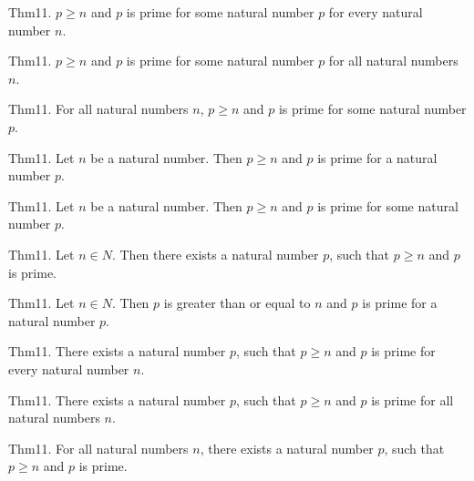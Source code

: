 \documentclass{article}
\begin{document}
Thm11. $p \geq n$ and $p$ is prime for some natural number $p$ for every natural number $n$.

Thm11. $p \geq n$ and $p$ is prime for some natural number $p$ for all natural numbers $n$.

Thm11. For all natural numbers $n$, $p \geq n$ and $p$ is prime for some natural number $p$.

Thm11. Let $n$ be a natural number. Then $p \geq n$ and $p$ is prime for a natural number $p$.

Thm11. Let $n$ be a natural number. Then $p \geq n$ and $p$ is prime for some natural number $p$.

Thm11. Let $n \in N$. Then there exists a natural number $p$, such that $p \geq n$ and $p$ is prime.

Thm11. Let $n \in N$. Then $p$ is greater than or equal to $n$ and $p$ is prime for a natural number $p$.

Thm11. There exists a natural number $p$, such that $p \geq n$ and $p$ is prime for every natural number $n$.

Thm11. There exists a natural number $p$, such that $p \geq n$ and $p$ is prime for all natural numbers $n$.

Thm11. For all natural numbers $n$, there exists a natural number $p$, such that $p \geq n$ and $p$ is prime.
\end{document}
